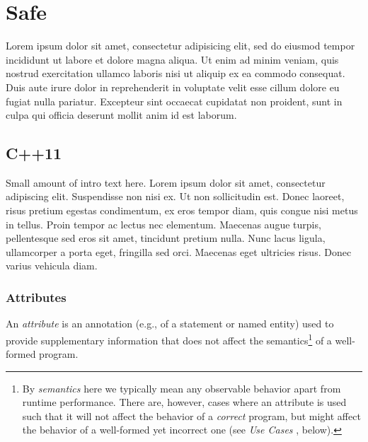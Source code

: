 \documentclass[twoside,10pt,letterpaper,usenames]{newstyle-PearsonGeneric-7-38}
\author{}
\date{}
\begin{document}




% 
% 
% 

\cleardoublepage %

\chapter{Safe}\label{SafeChap}
 
    
Lorem ipsum dolor sit amet, consectetur adipisicing elit, sed do eiusmod tempor incididunt ut labore et dolore magna aliqua. Ut enim ad minim veniam, quis nostrud exercitation ullamco laboris nisi ut aliquip ex ea commodo consequat. Duis aute irure dolor in reprehenderit in voluptate velit esse cillum dolore eu fugiat nulla pariatur. Excepteur sint occaecat cupidatat non proident, sunt in culpa qui officia deserunt mollit anim id est laborum.

\section[C++11]{C++11}\label{c++11}

Small amount of intro text here. Lorem ipsum dolor sit amet, consectetur
adipiscing elit. Suspendisse non nisi ex. Ut non sollicitudin est. Donec
laoreet, risus pretium egestas condimentum, ex eros tempor diam, quis
congue nisi metus in tellus. Proin tempor ac lectus nec elementum.
Maecenas augue turpis, pellentesque sed eros sit amet, tincidunt pretium
nulla. Nunc lacus ligula, ullamcorper a porta eget, fringilla sed orci.
Maecenas eget ultricies risus. Donec varius vehicula diam.

\subsection[Attributes]{Attributes}\label{attributes}

An \emph{attribute} is an annotation (e.g., of a statement or named
{entity}) used to provide supplementary information that does not affect
the semantics{\cprotect\footnote{By \emph{semantics} here we typically
mean any observable behavior apart from runtime performance. There
are, however, cases where an attribute is used such that it will not
affect the behavior of a \emph{correct} program, but might affect the
behavior of a well-formed yet incorrect one (see \emph{Use Cases} ,
below).}} of a well-formed program.
\end{document}

